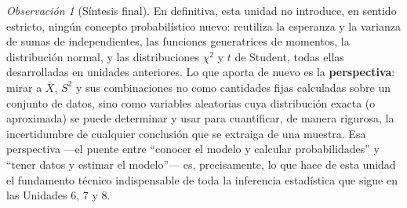 \documentclass[11pt,a4paper]{article}
\theoremstyle{plain}
\theoremstyle{definition}
\theoremstyle{remark}
\newtheorem{observacion}[teorema]{Observación}
\begin{document}
\begin{observacion}[Síntesis final]
En definitiva, esta unidad no introduce, en sentido estricto, ningún concepto probabilístico nuevo: reutiliza la esperanza y la varianza de sumas de independientes, las funciones generatrices de momentos, la distribución normal, y las distribuciones $\chi^2$ y $t$ de Student, todas ellas desarrolladas en unidades anteriores. Lo que aporta de nuevo es la \textbf{perspectiva}: mirar a $\bar X$, $S^2$ y sus combinaciones no como cantidades fijas calculadas sobre un conjunto de datos, sino como variables aleatorias cuya distribución exacta (o aproximada) se puede determinar y usar para cuantificar, de manera rigurosa, la incertidumbre de cualquier conclusión que se extraiga de una muestra. Esa perspectiva —el puente entre ``conocer el modelo y calcular probabilidades'' y ``tener datos y estimar el modelo''— es, precisamente, lo que hace de esta unidad el fundamento técnico indispensable de toda la inferencia estadística que sigue en las Unidades 6, 7 y 8.
\end{observacion}
\end{document}
